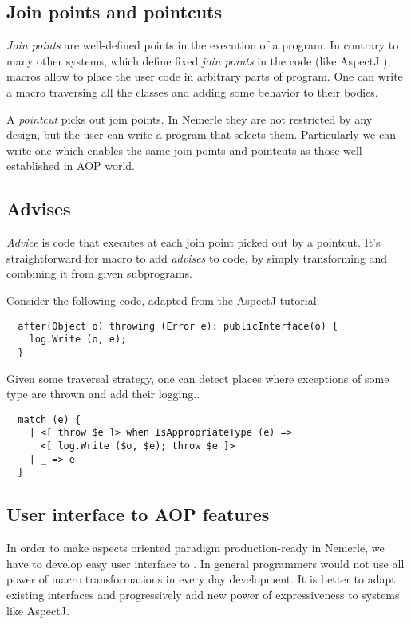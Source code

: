 \documentclass{llncs}
\begin{document}
\subsection{Join points and pointcuts}
\emph{Join points} are well-defined points in the execution of a program.
In contrary to many other systems, which define fixed \emph{join points}
in the code (like AspectJ \cite{AspectJ}), macros allow to place the user code in 
arbitrary parts of program. One can write a macro traversing all the classes
and adding some behavior to their bodies. 

A \emph{pointcut} picks out join points. In Nemerle they are not
restricted by any design, but the user can write a program that selects them.
Particularly we can write one which enables the same join points and pointcuts 
as those well established in AOP world.

\subsection{Advises}
\emph{Advice} is code that executes at each join point picked out by a pointcut.
It's straightforward for macro to add \emph{advises} to code, by simply transforming
and combining it from given subprograms.

Consider the following code, adapted from the AspectJ tutorial: 

\begin{verbatim}
  after(Object o) throwing (Error e): publicInterface(o) {
    log.Write (o, e);
  }
\end{verbatim}

Given some traversal strategy, one can detect places where exceptions of some
type are thrown and add their logging..

\begin{verbatim}
  match (e) {
    | <[ throw $e ]> when IsAppropriateType (e) =>
      <[ log.Write ($o, $e); throw $e ]>
    | _ => e
  }
\end{verbatim}

\subsection{User interface to AOP features}
In order to make aspects oriented paradigm production-ready in Nemerle, we have
to develop easy user interface to . In general programmers would not use all power
of macro transformations in every day development. It is better to adapt existing
interfaces and progressively add new power of expressiveness to systems like AspectJ.
\end{document}
